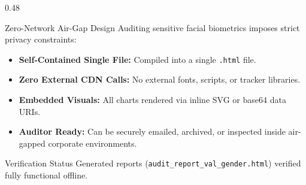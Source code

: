 \begin{frame}
\begin{columns}[T]
    \begin{column}{0.48\textwidth}
      \begin{successcard}{Zero-Network Air-Gap Design}
        \scriptsize
        Auditing sensitive facial biometrics imposes strict privacy constraints:
        \vspace{0.1cm}
        \begin{itemize}\scriptsize
          \item \textbf{Self-Contained Single File:} Compiled into a single \texttt{.html} file.
          \item \textbf{Zero External CDN Calls:} No external fonts, scripts, or tracker libraries.
          \item \textbf{Embedded Visuals:} All charts rendered via inline SVG or base64 data URIs.
          \item \textbf{Auditor Ready:} Can be securely emailed, archived, or inspected inside air-gapped corporate environments.
        \end{itemize}
      \end{successcard}

      \vspace{0.15cm}
      \begin{card}{Verification Status}
        \scriptsize
        Generated reports (\texttt{audit\_report\_val\_gender.html}) verified fully functional offline.
      \end{card}
    \end{column}
  \end{columns}
\end{frame}
